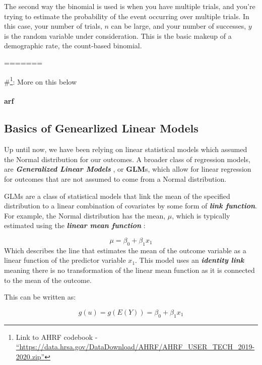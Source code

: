 \documentclass[
]{article}
\begin{document}
The second way the binomial is used is when you have multiple trials, and you're trying to estimate the probability of the event occurring over multiple trials. In this case, your number of trials, \(n\) can be large, and your number of successes, \(y\) is the random variable under consideration. This is the basic makeup of a demographic rate, the count-based binomial.

=======

\#\footnote{Link to AHRF codebook - \href{https://data.hrsa.gov/DataDownload/AHRF/AHRF_USER_TECH_2019-2020.zip}{``https://data.hrsa.gov/DataDownload/AHRF/AHRF\_USER\_TECH\_2019-2020.zip''}}: More on this below

\hypertarget{arf}{%
\paragraph{arf}\label{arf}}

\newpage

\hypertarget{basics-of-genearlized-linear-models-1}{%
\subsection{Basics of Genearlized Linear Models}\label{basics-of-genearlized-linear-models-1}}

Up until now, we have been relying on linear statistical models which assumed the Normal distribution for our outcomes. A broader class of regression models, are \textbf{\emph{Generalized Linear Models}} \citep{nelder_generalized_1972, mccullagh_generalized_1998}, or \textbf{GLM}s, which allow for linear regression for outcomes that are not assumed to come from a Normal distribution.

GLMs are a class of statistical models that link the mean of the specified distribution to a linear combination of covariates by some form of \textbf{\emph{link function}}. For example, the Normal distribution has the mean, \(\mu\), which is typically estimated using the \textbf{\emph{linear mean function}} :

\[\mu = \beta_0 + \beta_1 x_1\] Which describes the line that estimates the mean of the outcome variable as a linear function of the predictor variable \(x_1\). This model uses an \textbf{\emph{identity link}} meaning there is no transformation of the linear mean function as it is connected to the mean of the outcome.

This can be written as:

\[g(u) = g(E(Y)) = \beta_0 + \beta_1 x_1\]
\end{document}
